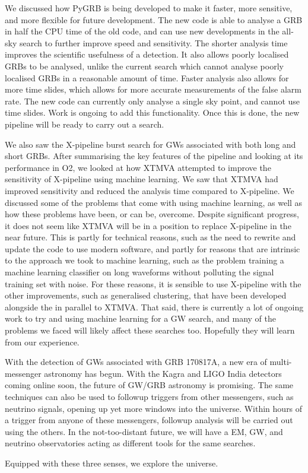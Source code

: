\documentclass[11pt]{cuthesis}
\newcommand{\xp}{X-pipeline }
\begin{document}
We discussed how PyGRB is being developed to make it faster, more sensitive, and more flexible for future development. The new code is able to analyse a GRB in half the CPU time of the old code, and can use new developments in the all-sky search to further improve speed and sensitivity. The shorter analysis time improves the scientific usefulness of a detection. It also allows poorly localised GRBs to be analysed, unlike the current search which cannot analyse poorly localised GRBs in a reasonable amount of time. Faster analysis also allows for more time slides, which allows for more accurate measurements of the false alarm rate. The new code can currently only analyse a single sky point, and cannot use time slides. Work is ongoing to add this functionality. Once this is done, the new pipeline will be ready to carry out a search. 

We also saw the \xp burst search for GWs associated with both long and short GRBs. After summarising the key features of the pipeline and looking at its performance in O2, we looked at how XTMVA attempted to improve the sensitivity of \xp using machine learning. We saw that XTMVA had improved sensitivity and reduced the analysis time compared to X-pipeline. We discussed some of the problems that come with using machine learning, as well as how these problems have been, or can be, overcome. Despite significant progress, it does not seem like XTMVA will be in a position to replace \xp in the near future. This is partly for technical reasons, such as the need to rewrite and update the code to use modern software, and partly for reasons that are intrinsic to the approach we took to machine learning, such as the problem training a machine learning classifier on long waveforms without polluting the signal training set with noise. For these reasons, it is sensible to use \xp with the other improvements, such as generalised clustering, that have been developed alongside the in parallel to XTMVA. That said, there is currently a lot of ongoing work to try and using machine learning for a GW search, and many of the problems we faced will likely affect these searches too. Hopefully they will learn from our experience.

With the detection of GWs associated with GRB 170817A, a new era of multi-messenger astronomy has begun. With the Kagra and LIGO India detectors coming online soon, the future of GW/GRB astronomy is promising. The same techniques can also be used to followup triggers from other messengers, such as neutrino signals, opening up yet more windows into the universe. Within hours of a trigger from anyone of these messengers, followup analysis will be carried out using the others. In the not-too-distant future, we will have a EM, GW, and neutrino observatories acting as different tools for the same searches. 
\begin{center}

Equipped with these three senses, we explore the universe.

\end{center}
\end{document}
